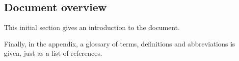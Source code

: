
\subsection{Document overview}
This initial section gives an introduction to the document.

Finally, in the appendix, a glossary of terms, definitions and abbreviations is given, just as a list of references.
